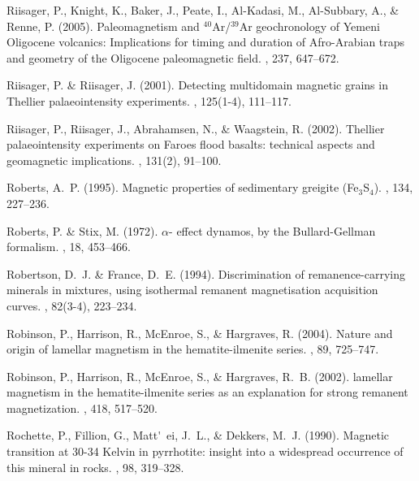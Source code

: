 Riisager, P., Knight, K., Baker, J., Peate, I., Al-Kadasi, M., Al-Subbary, A.,
  \& Renne, P. (2005).
\newblock Paleomagnetism and $^{40}$Ar/$^{39}$Ar geochronology of Yemeni
  Oligocene volcanics: Implications for timing and duration of Afro-Arabian
  traps and geometry of the Oligocene paleomagnetic field.
, 237, 647--672.

Riisager, P. \& Riisager, J. (2001).
\newblock Detecting multidomain magnetic grains in Thellier palaeointensity
  experiments.
, 125(1-4), 111--117.

Riisager, P., Riisager, J., Abrahamsen, N., \& Waagstein, R. (2002).
\newblock Thellier palaeointensity experiments on Faroes flood basalts:
  technical aspects and geomagnetic implications.
, 131(2), 91--100.

Roberts, A.~P. (1995).
\newblock Magnetic properties of sedimentary greigite (Fe$_3$S$_4$).
, 134, 227--236.

Roberts, P. \& Stix, M. (1972).
\newblock $\alpha$- effect dynamos, by the Bullard-Gellman formalism.
, 18, 453--466.

Robertson, D.~J. \& France, D.~E. (1994).
\newblock Discrimination of remanence-carrying minerals in mixtures, using
  isothermal remanent magnetisation acquisition curves.
, 82(3-4), 223--234.

Robinson, P., Harrison, R., McEnroe, S., \& Hargraves, R. (2004).
\newblock Nature and origin of lamellar magnetism in the hematite-ilmenite
  series.
, 89, 725--747.

Robinson, P., Harrison, R., McEnroe, S., \& Hargraves, R.~B. (2002).
\newblock lamellar magnetism in the hematite-ilmenite series as an explanation
  for strong remanent magnetization.
, 418, 517--520.

Rochette, P., Fillion, G., Matt\'~ei, J.~L., \& Dekkers, M.~J. (1990).
\newblock Magnetic transition at 30-34 Kelvin in pyrrhotite: insight into a
  widespread occurrence of this mineral in rocks.
, 98, 319--328.

